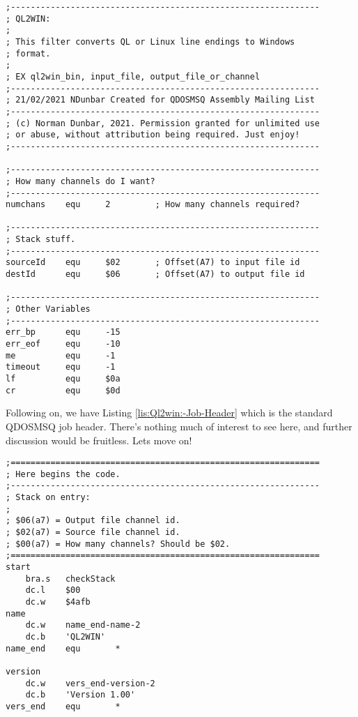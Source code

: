 \begin{lstlisting}[caption={Ql2win: Equates},label={lis:Ql2win:-Equates},firstnumber=1]
;--------------------------------------------------------------
; QL2WIN:
;
; This filter converts QL or Linux line endings to Windows 
; format.
;
; EX ql2win_bin, input_file, output_file_or_channel
;--------------------------------------------------------------
; 21/02/2021 NDunbar Created for QDOSMSQ Assembly Mailing List
;--------------------------------------------------------------
; (c) Norman Dunbar, 2021. Permission granted for unlimited use
; or abuse, without attribution being required. Just enjoy!
;--------------------------------------------------------------

;--------------------------------------------------------------
; How many channels do I want?
;--------------------------------------------------------------
numchans    equ     2         ; How many channels required?

;--------------------------------------------------------------
; Stack stuff.
;--------------------------------------------------------------
sourceId    equ     $02       ; Offset(A7) to input file id
destId      equ     $06       ; Offset(A7) to output file id

;--------------------------------------------------------------
; Other Variables
;--------------------------------------------------------------
err_bp      equ     -15
err_eof     equ     -10
me          equ     -1
timeout     equ     -1
lf          equ     $0a
cr          equ     $0d

\end{lstlisting}

Following on, we have Listing \ref{lis:Ql2win:-Job-Header} which
is the standard QDOSMSQ job header. There's nothing much of interest
to see here, and further discussion would be fruitless. Lets move
on!

\begin{lstlisting}[caption={Ql2win: Job Header},label={lis:Ql2win:-Job-Header},firstnumber=35]
;==============================================================
; Here begins the code.
;--------------------------------------------------------------
; Stack on entry:
;
; $06(a7) = Output file channel id.
; $02(a7) = Source file channel id.
; $00(a7) = How many channels? Should be $02.
;==============================================================
start
    bra.s   checkStack
    dc.l    $00
    dc.w    $4afb
name
    dc.w    name_end-name-2
    dc.b    'QL2WIN'
name_end    equ       *

version
    dc.w    vers_end-version-2
    dc.b    'Version 1.00'
vers_end    equ       *
\end{lstlisting}

